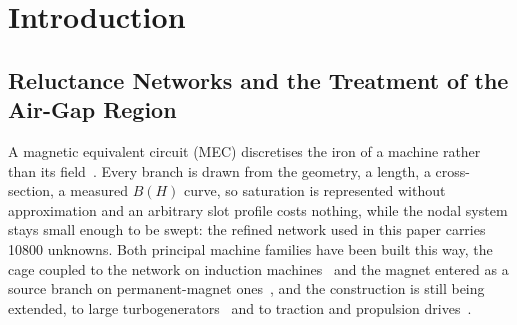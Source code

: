 \documentclass[10pt,a4paper,twocolumn]{article}
\theoremstyle{plain}
\theoremstyle{remark}
\begin{document}
%
%
%
\section{Introduction}
\label{sec:intro}

\subsection{Reluctance Networks and the Treatment of the Air-Gap Region}

A magnetic equivalent circuit (MEC) discretises the iron of a machine rather
than its field~\cite{ostovic1989,sudhoff,amrhein}. Every branch is drawn
from the geometry, a length, a cross-section, a measured $B(H)$
curve, so saturation is represented without approximation and an
arbitrary slot profile costs nothing, while the nodal system stays small
enough to be swept: the refined network used in this paper carries
\num{10800} unknowns. Both principal machine families have been built
this way, the cage coupled to the network on induction
machines~\cite{ostovic1986,hosseini2026} and the magnet entered as a
source branch on permanent-magnet ones~\cite{hsieh,sapmaz2022}, and the
construction is still being extended, to large
turbogenerators~\cite{zhang2022} and to traction and propulsion
drives~\cite{watthewaduge2023}.
\end{document}
